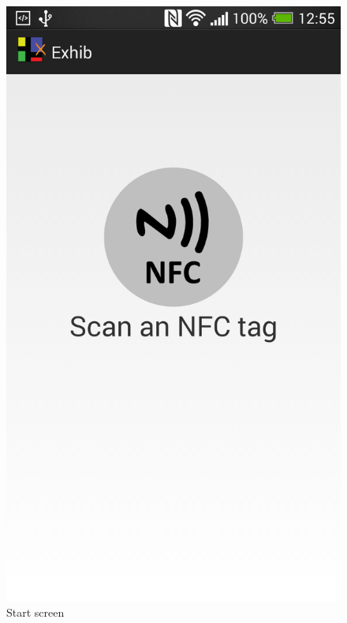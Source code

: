 \begin{figure}[H]
\begin{minipage}[b]{0.5\columnwidth}
\centering
\includegraphics[width=0.7\columnwidth]{img/finaldesign/nfcscreen.png}
\caption{Start screen}
\label{fig:nfcscreen}
\end{minipage}
\hspace{0.5cm}
\begin{minipage}[b]{0.5\columnwidth}
\centering

\end{minipage}
\end{figure}
